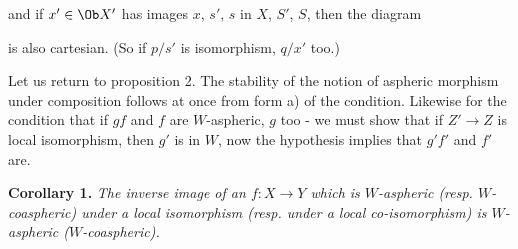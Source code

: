 \begin{center}
\end{center}

and if $x' \in \Ob X'$ has images $x$, $s'$, $s$ in $X$, $S'$, $S$, then the diagram

\begin{center}
\end{center}

is also cartesian. (So if $p/s'$ is isomorphism, $q/x'$ too.)


Let us return to proposition 2. The stability of the notion of aspheric morphism under composition follows at once from form a) of the condition. Likewise for the condition that if $gf$ and $f$ are $W$-aspheric, $g$ too - we must show that if $Z' \longrightarrow Z$ is local isomorphism, then $g'$ is in $W$, now the hypothesis implies that $g'f'$ and $f'$ are.

\begin{center}
\end{center}

\textbf{Corollary 1.} \textit{The inverse image of an $f : X \longrightarrow Y$ which is $W$-aspheric (resp. $W$-coaspheric) under a local isomorphism (resp. under a local co-isomorphism) is $W$-aspheric ($W$-coaspheric).}

\begin{center}
\end{center}

